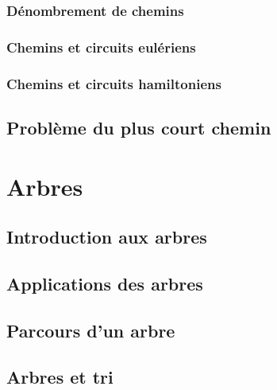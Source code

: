 \documentclass[
  letterpaper,
]{scrbook}
\theoremstyle{plain}
\theoremstyle{definition}
\theoremstyle{definition}
\theoremstyle{remark}
\begin{document}
\hypertarget{duxe9nombrement-de-chemins}{%
\subsection{Dénombrement de chemins}\label{duxe9nombrement-de-chemins}}

\hypertarget{chemins-et-circuits-euluxe9riens}{%
\subsection{Chemins et circuits
eulériens}\label{chemins-et-circuits-euluxe9riens}}

\hypertarget{chemins-et-circuits-hamiltoniens}{%
\subsection{Chemins et circuits
hamiltoniens}\label{chemins-et-circuits-hamiltoniens}}

\hypertarget{probluxe8me-du-plus-court-chemin}{%
\section{Problème du plus court
chemin}\label{probluxe8me-du-plus-court-chemin}}


\hypertarget{arbres}{%
\chapter{Arbres}\label{arbres}}

\hypertarget{introduction-aux-arbres}{%
\section{Introduction aux arbres}\label{introduction-aux-arbres}}

\hypertarget{applications-des-arbres}{%
\section{Applications des arbres}\label{applications-des-arbres}}

\hypertarget{parcours-dun-arbre}{%
\section{Parcours d'un arbre}\label{parcours-dun-arbre}}

\hypertarget{arbres-et-tri}{%
\section{Arbres et tri}\label{arbres-et-tri}}
\end{document}
